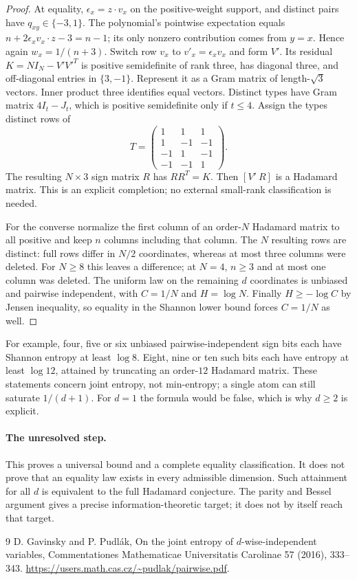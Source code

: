 \documentclass[11pt]{article}
\begin{document}
\begin{proof}
At equality, $\epsilon_x=z\cdot v_x$ on the positive-weight support,
and distinct pairs have $q_{xy}\in\{-3,1\}$. The polynomial's
pointwise expectation equals
$n+2\epsilon_xv_x\cdot z-3=n-1$; its only nonzero contribution
comes from $y=x$. Hence again $w_x=1/(n+3)$.
Switch row $v_x$ to $v'_x=\epsilon_xv_x$ and form $V'$.
Its residual $K=NI_N-V'V'^T$ is positive semidefinite of rank three,
has diagonal three, and off-diagonal entries in $\{3,-1\}$.
Represent it as a Gram matrix of length-$\sqrt3$ vectors. Inner
product three identifies equal vectors. Distinct types have Gram
matrix $4I_t-J_t$, which is positive semidefinite only if $t\le4$.
Assign the types distinct rows of
\[
 T=\begin{pmatrix}1&1&1\\1&-1&-1\\-1&1&-1\\-1&-1&1\end{pmatrix}.
\]
The resulting $N\times3$ sign matrix $R$ has $RR^T=K$.
Then $[V'\ R]$ is a Hadamard matrix. This is an explicit completion;
no external small-rank classification is needed.

For the converse normalize the first column of an order-$N$ Hadamard
matrix to all positive and keep $n$ columns including that column.
The $N$ resulting rows are distinct: full rows differ in $N/2$
coordinates, whereas at most three columns were deleted. For $N\ge8$
this leaves a difference; at $N=4$, $n\ge3$ and at most one column
was deleted. The uniform law on the remaining $d$ coordinates is
unbiased and pairwise independent, with $C=1/N$ and $H=\log N$.
Finally $H\ge-\log C$ by Jensen inequality, so equality in the Shannon
lower bound forces $C=1/N$ as well.
\end{proof}

For example, four, five or six unbiased pairwise-independent sign bits
each have Shannon entropy at least $\log8$. Eight, nine or ten such
bits each have entropy at least $\log12$, attained by truncating an
order-$12$ Hadamard matrix. These statements concern joint entropy,
not min-entropy; a single atom can still saturate $1/(d+1)$.
For $d=1$ the formula would be false, which is why $d\ge2$ is explicit.

\paragraph{The unresolved step.}
This proves a universal bound and a complete equality classification.
It does not prove that an equality law exists in every admissible
dimension. Such attainment for all $d$ is equivalent to the full
Hadamard conjecture. The parity and Bessel argument gives a precise
information-theoretic target; it does not by itself reach that target.

\begin{thebibliography}{9}
 D. Gavinsky and P. Pudl\'ak,
On the joint entropy of $d$-wise-independent variables,
Commentationes Mathematicae Universitatis Carolinae 57 (2016), 333--343.
\url{https://users.math.cas.cz/~pudlak/pairwise.pdf}.
\end{thebibliography}
\end{document}
